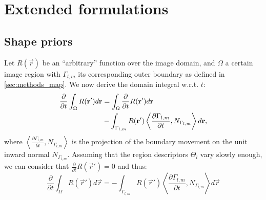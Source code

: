 
\section{Extended formulations}

\subsection{Shape priors}
\label{app:shape_priors}
Let $R(\vec{r})$ be an ``arbitrary'' function over the image domain,
and $\Omega$ a certain image region with $\Gamma_{l,m}$ its corresponding
outer boundary as defined in \autoref{sec:methods_map}.
We now derive the domain integral w.r.t. $t$:
  \begin{align*}
  \frac{\partial}{\partial t} \int_\Omega R(\vec{r}') d\vec{r} &=
  \int_\Omega \frac{\partial}{\partial t}R(\vec{r}') d\vec{r} \notag\\
  &- \int_{\Gamma_{l,m}} R(\vec{r}') \left\langle \frac{\partial \Gamma_{l,m} }{\partial t},
  N_{\Gamma_{l,m}}\right\rangle d\vec{r},
  \end{align*}
  where $\left\langle\frac{\partial\Gamma_{l,m}}{\partial t}, N_{\Gamma_{l,m}}\right\rangle$ is
  the projection of the boundary movement on the unit inward normal $N_{\Gamma_{l,m}}$.
Assuming that the region descriptors $\Theta_l$ vary slowly enough, we can consider
  that $\frac{\partial}{\partial t} R(\vec{r}') = 0$ and thus:
  \begin{equation}
  \frac{\partial}{\partial t} \int_\Omega R(\vec{r}') d\vec{r} =
  - \int_{\Gamma_{l,m}} R(\vec{r}') \left\langle \frac{\partial \Gamma_{l,m} }{\partial t},
  N_{\Gamma_{l,m}}\right\rangle d\vec{r}
  \label{eq:shape_gradients}
  \end{equation}